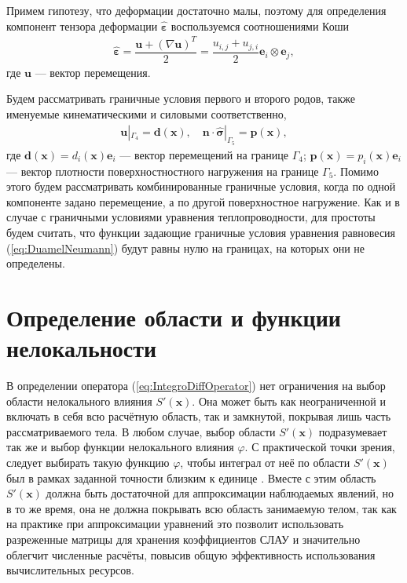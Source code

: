 Примем гипотезу, что деформации достаточно малы, поэтому для определения компонент тензора деформации $\widehat{\boldsymbol{\varepsilon}}$ воспользуемся соотношениями \mbox{Коши \cite{MSS}}
\begin{gather*}
	\widehat{\boldsymbol{\varepsilon}} = 
	\dfrac{\boldsymbol{u} + (\nabla \boldsymbol{u})^T}{2} = 
	\dfrac{u_{i, j} + u_{j, i}}{2} \boldsymbol{e}_i \otimes \boldsymbol{e}_j,
\end{gather*}
где $\boldsymbol{u}$ --- вектор перемещения.

Будем рассматривать граничные условия первого и второго родов, также именуемые кинематическими и силовыми соответственно,
\begin{gather}
	\label{eq:StressBoundaries}
	\boldsymbol{u}|_{\Gamma_4} = \boldsymbol{d} (\boldsymbol{x}),
	\quad
	\boldsymbol{n} \cdot \widehat{\boldsymbol{\sigma}}|_{\Gamma_5} = \boldsymbol{p} (\boldsymbol{x}),
\end{gather}
где $\boldsymbol{d} (\boldsymbol{x}) = d_i (\boldsymbol{x}) \boldsymbol{e}_i$ --- вектор перемещений на границе $\Gamma_4$;
$\boldsymbol{p} (\boldsymbol{x}) = p_i (\boldsymbol{x}) \boldsymbol{e}_i$ --- вектор плотности поверхностностного нагружения на границе $\Gamma_5$. Помимо этого будем рассматривать комбинированные граничные условия, когда по одной компоненте задано перемещение, а по другой поверхностное нагружение. Как и в случае с граничными условиями уравнения теплопроводности, для простоты будем считать, что функции задающие граничные условия уравнения равновесия (\ref{eq:DuamelNeumann}) будут равны нулю на границах, на которых они не определены.

\section{Определение области и функции нелокальности}\label{sec:BasicRelations/InfluenceFunction}

В определении оператора (\ref{eq:IntegroDiffOperator}) нет ограничения на выбор области нелокального влияния $S'(\boldsymbol{x})$. Она  может быть как неограниченной и включать в себя всю расчётную область, так и замкнутой, покрывая лишь часть рассматриваемого тела. В любом случае, выбор области $S'(\boldsymbol{x})$ подразумевает так же и выбор функции нелокального влияния $\varphi$. С практической точки зрения, следует выбирать такую функцию $\varphi$, чтобы интеграл от неё по области $S'(\boldsymbol{x})$ был в рамках заданной точности близким к единице \cite{Eringen3}. Вместе с этим область $S'(\boldsymbol{x})$ должна быть достаточной для аппроксимации наблюдаемых явлений, но в то же время, она не должна покрывать всю область занимаемую телом, так как на практике при аппроксимации уравнений это позволит использовать разреженные матрицы для хранения коэффициентов СЛАУ \cite{Pisanetzkiy} и значительно облегчит численные расчёты, повысив общую эффективность использования вычислительных ресурсов. 

